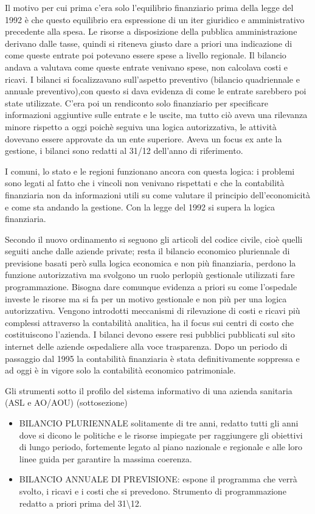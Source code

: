 \documentclass[]{article}
\begin{document}
Il motivo per cui prima c'era solo l'equilibrio finanziario prima della
legge del 1992 è che questo equilibrio era espressione di un iter
giuridico e amministrativo precedente alla spesa. Le risorse a
disposizione della pubblica amministrazione derivano dalle tasse, quindi
si riteneva giusto dare a priori una indicazione di come queste entrate
poi potevano essere spese a livello regionale. Il bilancio andava a
valutava come queste entrate venivano spese, non calcolava costi e
ricavi. I bilanci si focalizzavano sull'aspetto preventivo (bilancio
quadriennale e annuale preventivo),con questo si dava evidenza di come
le entrate sarebbero poi state utilizzate. C'era poi un rendiconto solo
finanziario per specificare informazioni aggiuntive sulle entrate e le
uscite, ma tutto ciò aveva una rilevanza minore rispetto a oggi poichè
seguiva una logica autorizzativa, le attività dovevano essere approvate
da un ente superiore. Aveva un focus ex ante la gestione, i bilanci sono
redatti al 31/12 dell'anno di riferimento.

I comuni, lo stato e le regioni funzionano ancora con questa logica: i
problemi sono legati al fatto che i vincoli non venivano rispettati e
che la contabilità finanziaria non da informazioni utili su come
valutare il principio dell'economicità e come sta andando la gestione.
Con la legge del 1992 si supera la logica finanziaria.

Secondo il nuovo ordinamento si seguono gli articoli del codice civile,
cioè quelli seguiti anche dalle aziende private; resta il bilancio
economico pluriennale di previsione basati però sulla logica economica e
non più finanziaria, perdono la funzione autorizzativa ma svolgono un
ruolo perlopiù gestionale utilizzati fare programmazione. Bisogna dare
comunque evidenza a priori su come l'ospedale investe le risorse ma si
fa per un motivo gestionale e non più per una logica autorizzativa.
Vengono introdotti meccanismi di rilevazione di costi e ricavi più
complessi attraverso la contabilità analitica, ha il focus sui centri di
costo che costituiscono l'azienda. I bilanci devono essere resi pubblici
pubblicati sul sito internet delle aziende ospedaliere alla voce
trasparenza. Dopo un periodo di passaggio dal 1995 la contabilità
finanziaria è stata definitivamente soppressa e ad oggi è in vigore solo
la contabilità economico patrimoniale.

Gli strumenti sotto il profilo del sistema informativo di una azienda
sanitaria (ASL e AO/AOU) (sottosezione)

\begin{itemize}
\item
  BILANCIO PLURIENNALE solitamente di tre anni, redatto tutti gli anni
  dove si dicono le politiche e le risorse impiegate per raggiungere gli
  obiettivi di lungo periodo, fortemente legato al piano nazionale e
  regionale e alle loro linee guida per garantire la massima coerenza.
\item
  BILANCIO ANNUALE DI PREVISIONE: espone il programma che verrà svolto,
  i ricavi e i costi che si prevedono. Strumento di programmazione
  redatto a priori prima del 31\textbackslash{}12.
\end{itemize}
\end{document}
